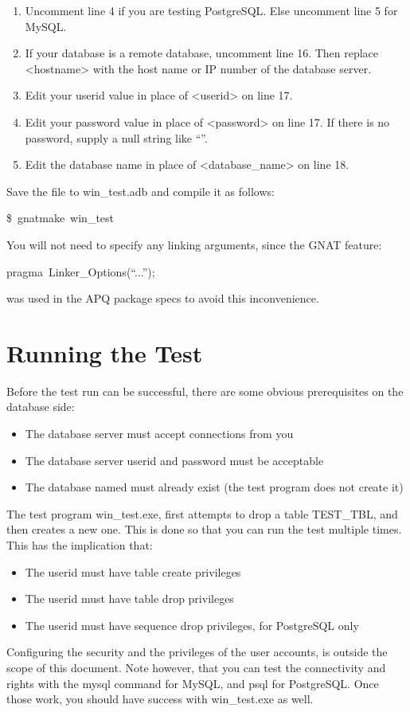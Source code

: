 \documentclass[english]{report}
\newenvironment{lyxcode}
   {\begin{list}{}{
     \setlength{\rightmargin}{\leftmargin}
     \setlength{\listparindent}{0pt}%
     \raggedright
     \setlength{\itemsep}{0pt}
     \setlength{\parsep}{0pt}
     \normalfont\ttfamily}%
    \item[]}
   {\end{list}}
\begin{document}
\begin{enumerate}
\item Uncomment line 4 if you are testing PostgreSQL. Else uncomment line
5 for MySQL.
\item If your database is a remote database, uncomment line 16. Then replace
<hostname> with the host name or IP number of the database server.
\item Edit your userid value in place of <userid> on line 17.
\item Edit your password value in place of <password> on line 17. If there
is no password, supply a null string like {}``''.
\item Edit the database name in place of <database\_name> on line 18.
\end{enumerate}
Save the file to win\_test.adb and compile it as follows:

\begin{lyxcode}
\$~gnatmake~win\_test
\end{lyxcode}
You will not need to specify any linking arguments, since the GNAT
feature:

\begin{lyxcode}
pragma~Linker\_Options({}``...'');
\end{lyxcode}
was used in the APQ package specs to avoid this inconvenience.


\section{Running the Test}

Before the test run can be successful, there are some obvious prerequisites
on the database side:

\begin{itemize}
\item The database server must accept connections from you
\item The database server userid and password must be acceptable
\item The database named must already exist (the test program does not create
it)
\end{itemize}
The test program win\_test.exe, first attempts to drop a table TEST\_TBL,
and then creates a new one. This is done so that you can run the test
multiple times. This has the implication that:

\begin{itemize}
\item The userid must have table create privileges
\item The userid must have table drop privileges
\item The userid must have sequence drop privileges, for PostgreSQL only
\end{itemize}
Configuring the security and the privileges of the user accounts,
is outside the scope of this document. Note however, that you can
test the connectivity and rights with the mysql command for MySQL,
and psql for PostgreSQL. Once those work, you should have success
with win\_test.exe as well.
\end{document}
